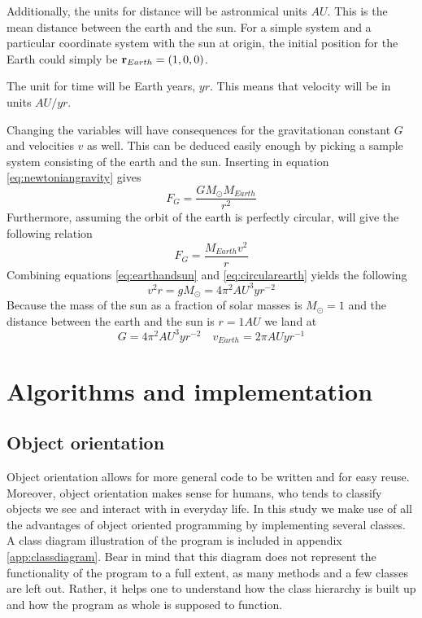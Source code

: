 \documentclass[10pt,a4paper]{amsart}
\begin{document}
Additionally, the units for distance will be astronmical units $AU$. This is the mean distance between the earth and the sun. For a simple system and a particular coordinate system with the sun at origin, the initial position for the Earth could simply be $\vb{r}_ {Earth}=(1,0,0)$.

The unit for time will be Earth years, $yr$. This means that velocity will be in units $AU/yr$.

Changing the variables will have consequences for the gravitationan constant $G$ and velocities $v$ as well. This can be deduced easily enough by picking a sample system consisting of the earth and the sun. Inserting in equation \ref{eq:newtoniangravity} gives
\begin{equation}
\label{eq:earthandsun}
F_G = \frac{GM_{\odot}M_{Earth}}{r^2}
\end{equation}
Furthermore, assuming the orbit of the earth is perfectly circular, will give the following relation
\begin{equation}
\label{eq:circularearth}
F_G = \frac{M_{Earth}v^2}{r}
\end{equation}
Combining equations \ref{eq:earthandsun} and \ref{eq:circularearth} yields the following
\begin{equation}
v^2r=gM_{\odot}=4\pi^2AU^3yr^{-2}
\end{equation}
Because the mass of the sun as a fraction of solar masses is $M_{\odot}=1$  and the distance between the earth and the sun is $r=1AU$ we land at
\begin{equation}
G=4\pi^2AU^3yr^{-2} \quad v_{Earth}=2\pi AUyr^{-1}
\end{equation}

\section{Algorithms and implementation}

\subsection{Object orientation}
Object orientation allows for more general code to be written and for easy reuse. Moreover, object orientation makes sense for humans, who tends to classify objects we see and interact with in everyday life. In this study we make use of all the advantages of object oriented programming by implementing several classes. A class diagram illustration of the program is included in appendix \ref{app:classdiagram}. Bear in mind that this diagram does not represent the functionality of the program to a full extent, as many methods and a few classes are left out. Rather, it helps one to understand how the class hierarchy is built up and how the program as whole is supposed to function.
\end{document}

